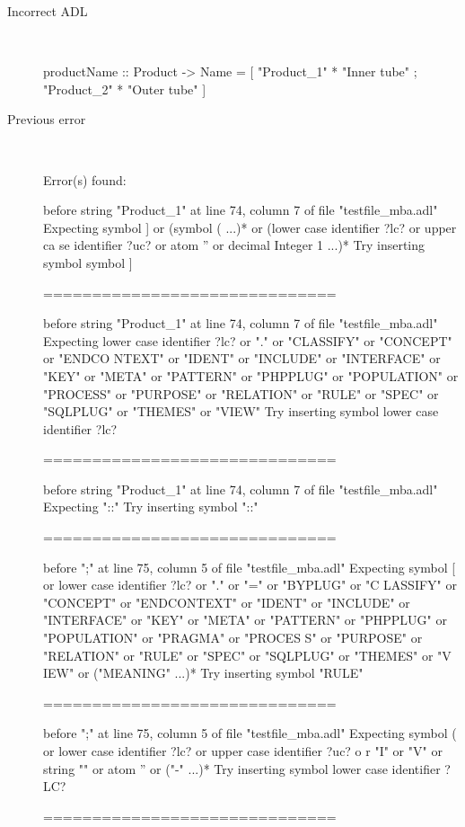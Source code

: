 \hrulefill

\begin{description}
  \item[Incorrect ADL]~\\
\begin{adl}
productName :: Product -> Name
  = [ "Product_1" * "Inner tube"
    ; "Product_2" * "Outer tube"
    ]\end{adl}
  \item[Previous error]~\\
\begin{haskell}
Error(s) found:

before string "Product_1" at line 74, column 7 of file "testfile_mba.adl"
Expecting symbol ] or (symbol ( ...)* or (lower case identifier ?lc? or upper ca
se identifier ?uc? or atom '' or decimal Integer 1 ...)*
Try inserting symbol symbol ]

==============================

before string "Product_1" at line 74, column 7 of file "testfile_mba.adl"
Expecting lower case identifier ?lc? or "." or "CLASSIFY" or "CONCEPT" or "ENDCO
NTEXT" or "IDENT" or "INCLUDE" or "INTERFACE" or "KEY" or "META" or "PATTERN" or
 "PHPPLUG" or "POPULATION" or "PROCESS" or "PURPOSE" or "RELATION" or "RULE" or
"SPEC" or "SQLPLUG" or "THEMES" or "VIEW"
Try inserting symbol lower case identifier ?lc?

==============================

before string "Product_1" at line 74, column 7 of file "testfile_mba.adl"
Expecting "::"
Try inserting symbol "::"

==============================

before ";" at line 75, column 5 of file "testfile_mba.adl"
Expecting symbol [ or lower case identifier ?lc? or "." or "=" or "BYPLUG" or "C
LASSIFY" or "CONCEPT" or "ENDCONTEXT" or "IDENT" or "INCLUDE" or "INTERFACE" or
"KEY" or "META" or "PATTERN" or "PHPPLUG" or "POPULATION" or "PRAGMA" or "PROCES
S" or "PURPOSE" or "RELATION" or "RULE" or "SPEC" or "SQLPLUG" or "THEMES" or "V
IEW" or ("MEANING" ...)*
Try inserting symbol "RULE"

==============================

before ";" at line 75, column 5 of file "testfile_mba.adl"
Expecting symbol ( or lower case identifier ?lc? or upper case identifier ?uc? o
r "I" or "V" or string "" or atom '' or ("-" ...)*
Try inserting symbol lower case identifier ?LC?

==============================


\end{haskell}
\end{description}
